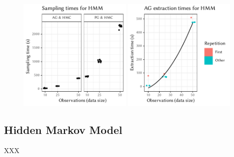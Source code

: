 \cleartoverso
\FloatBlock

\begin{figure}[t!]
  \centering
    \includegraphics[width=0.49\textwidth]{figures/HMM-sampling_times}
  \includegraphics[width=0.49\textwidth]{figures/HMM-compile_times}
  \label{fig:plots-hmm}
\end{figure}

\subsection*{Hidden Markov Model}

XXX


\cleartorecto
\FloatBlock

